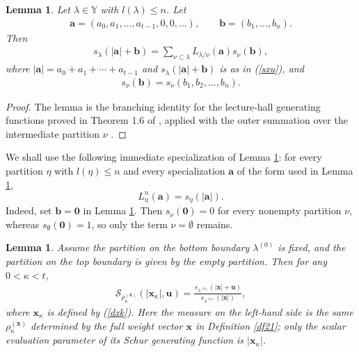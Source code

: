 \documentclass[11pt]{amsart}
\theoremstyle{plain}
\newtheorem{lemma}[theorem]{Lemma}
\newcommand\YY{{\mathbb {Y}}}
\renewcommand\ell{l}
\numberwithin{equation}{section}
\numberwithin{theorem}{section}
\numberwithin{figure}{section}
\begin{document}
\begin{lemma}\label{l02}Let $\lambda\in\YY$ with $l(\lambda)\leq n$. Let
\begin{eqnarray*}
\mathbf{a}=(a_0,a_1,\ldots,a_{t-1},0,0,\ldots),\qquad
\mathbf{b}=(b_1,\ldots,b_n).
\end{eqnarray*}
Then 
\begin{eqnarray*}
s_{\lambda}(|\mathbf{a}|+\mathbf{b})=\sum_{\nu\subset\lambda}L_{\lambda/\nu}(\mathbf{a})s_{\nu}(\mathbf{b}),
\end{eqnarray*}
where $|\mathbf{a}|=a_0+a_1+\cdots+a_{t-1}$ and $s_{\lambda}(|\mathbf{a}|+\mathbf{b})$ is as in (\ref{sxu}), and
\begin{eqnarray*}
s_{\nu}(\mathbf{b})=
s_{\nu}(b_1,b_2,\ldots,b_n).
\end{eqnarray*}
\end{lemma}
\begin{proof}The lemma    is the branching identity for the lecture-hall generating functions proved in  Theorem 1.6 of \cite{CK20}   , applied with the outer summation over the intermediate partition $\nu$ .
\end{proof}

We shall use the following immediate specialization of Lemma \ref{l02}:
for every partition $\eta$ with $\ell(\eta)\leq n$ and every specialization $\mathbf{a}$ of the form used in Lemma \ref{l02},
\[
    L_{\eta}^n(\mathbf{a})=s_{\eta}(|\mathbf{a}|).
\]
Indeed, set $\mathbf{b}=\mathbf{0}$ in Lemma \ref{l02}. Then
$s_{\nu}(\mathbf{0})=0$ for every nonempty partition $\nu$, whereas
$s_{\emptyset}(\mathbf{0})=1$, so only the term $\nu=\emptyset$ remains.

\begin{lemma}\label{l03}Assume the partition on the bottom boundary $\lambda^{(0)}$ is fixed, and the partition on the top boundary is given by the empty partition. Then for any $0<\kappa<t$,
\begin{eqnarray*}
\mathcal{S}_{\rho_{\kappa}^{(\mathbf{x})}}
(|\mathbf{x}_{\kappa}|,\mathbf{u})=
\frac{s_{\lambda^{(0)}}(|\mathbf{x}|+\mathbf{u})}{s_{
\lambda^{(0)}}(|\mathbf{x}|)},
\end{eqnarray*}
where    $\mathbf{x}_{\kappa}$  is defined by (\ref{dxk}). Here the measure on the left-hand side is the same
$\rho_{\kappa}^{(\mathbf{x})}$ determined by the full weight vector $\mathbf{x}$
in Definition \ref{df21}; only the scalar evaluation parameter of its Schur
generating function is $|\mathbf{x}_{\kappa}|$.
\end{lemma}
\end{document}
